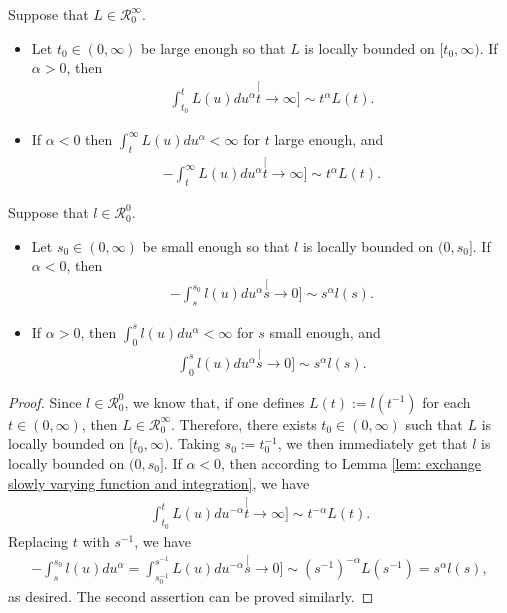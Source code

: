\begin{lem}
\label{lem: exchange slowly varying function and integration}
	Suppose that $L\in \mathcal R^\infty_0$.
\begin{itemize}
\item
	Let $t_0\in (0,\infty)$ be large enough so that $L$ is locally bounded on $[t_0,\infty)$. If $\alpha>0 $, then
\begin{align}
	\int_{t_0}^t L(u)du^\alpha
	\stackrel[t\to \infty]{}{\sim} t^\alpha L(t).
\end{align}
\item
	If $\alpha< 0$ then $\int_t^\infty L(u) du^\alpha < \infty$ for $t$ large enough, and
\begin{align}
	-\int_t^\infty L(u)du^\alpha
	\stackrel[t\to \infty]{}{\sim} t^\alpha L(t).
\end{align}
\end{itemize}
\end{lem}

\begin{cor}
\label{cro: power law and ingetration}
	Suppose that $l\in \mathcal R^0_0$.
\begin{itemize}
\item
	Let $s_0\in (0,\infty)$ be small enough so that $l$ is locally bounded on $(0,s_0]$.
	If $\alpha < 0$, then
\begin{align}
	-\int_s^{s_0} l(u)du^\alpha
	\stackrel[s\to 0]{}{\sim} s^{\alpha} l(s).
\end{align}
\item
	If $\alpha > 0$, then $\int_0^s l(u)du^\alpha<\infty$ for $s$ small enough, and
\begin{align}
	\int_0^s l(u)du^\alpha
	\stackrel[s\to 0]{}{\sim} s^{\alpha} l(s).
\end{align}
\end{itemize}
\end{cor}	

\begin{proof}
	Since $l \in \mathcal R^0_0$, we know that, if one defines $L(t):=l(t^{-1})$ for each $t\in (0,\infty)$, then $ L \in \mathcal R^\infty_0$.
	Therefore, there exists $t_0\in (0,\infty)$ such that $L$ is locally bounded on $[t_0,\infty)$.
	Taking $s_0:= t_0^{-1}$, we then immediately get that $l$ is locally bounded on $(0,s_0]$.
	If $\alpha<0 $, then according to Lemma \ref{lem: exchange slowly varying function and integration}, we have
\begin{align}
	\int_{t_0}^t L(u)du^{-\alpha}
	\stackrel[t\to \infty]{}{\sim} t^{-\alpha}  L(t).
\end{align}
	Replacing $t$ with $s^{-1}$, we have
\begin{align}
	-\int_{s}^{s_0} l(u)du^{\alpha}
	=\int_{s_0^{-1}}^{s^{-1}} L(u)du^{-\alpha}
	\stackrel[s\to 0]{}{\sim}  (s^{-1})^{-\alpha}L(s^{-1})
	=s^\alpha l(s),
\end{align}
	as desired.
	The second assertion can be proved similarly.
\end{proof}


